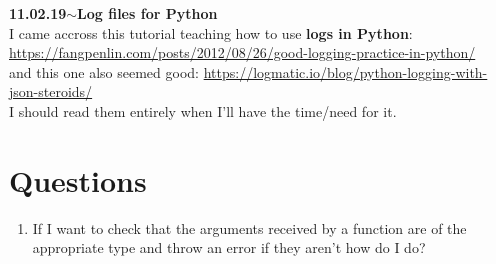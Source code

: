 \documentclass[11pt,a4paper]{article}
\newenvironment{loggentry}[2]%
{\noindent\textbf{#1}\hspace{1cm}$\mathbf{\sim}$\text{ }\textbf{#2}\\}{\vspace{0.5cm}}
\begin{document}
\begin{loggentry}{11.02.19}{Log files for Python}

I came accross this tutorial teaching how to use \textbf{logs in Python}:\\
\url{https://fangpenlin.com/posts/2012/08/26/good-logging-practice-in-python/}\\
and this one also seemed good:
\url{https://logmatic.io/blog/python-logging-with-json-steroids/}\\
I should read them entirely when I'll have the time/need for it.

\end{loggentry}

\section{Questions}
\begin{enumerate}
\item If I want to check that the arguments received by a function are of the appropriate type and throw an error if they aren't how do I do?
\end{enumerate}
\end{document}
